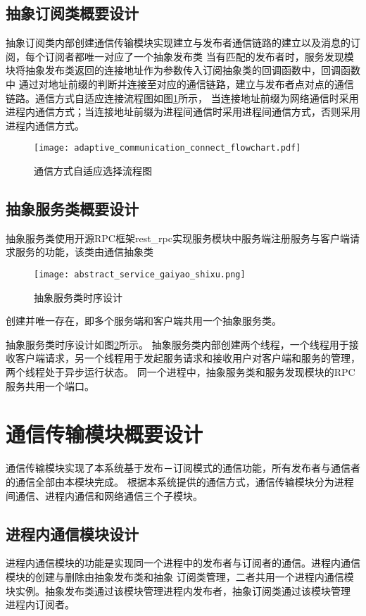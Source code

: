 \subsection{抽象订阅类概要设计}
抽象订阅类内部创建通信传输模块实现建立与发布者通信链路的建立以及消息的订阅，每个订阅者都唯一对应了一个抽象发布类
当有匹配的发布者时，服务发现模块将抽象发布类返回的连接地址作为参数传入订阅抽象类的回调函数中，回调函数中
通过对地址前缀的判断并连接至对应的通信链路，建立与发布者点对点的通信链路。通信方式自适应连接流程图如图\ref{adaptive_communication_connect_flowchart}所示，
当连接地址前缀为网络通信时采用进程内通信方式；当连接地址前缀为进程间通信时采用进程间通信方式，否则采用进程内通信方式。
\begin{figure}[H]
  \centering
  \texttt{[image: adaptive\_communication\_connect\_flowchart.pdf]}
  \caption{通信方式自适应选择流程图}
  \label{adaptive_communication_connect_flowchart}
\end{figure}

\subsection{抽象服务类概要设计}
抽象服务类使用开源RPC框架rest\_rpc实现服务模块中服务端注册服务与客户端请求服务的功能，该类由通信抽象类
\begin{figure}[htb]
  \centering
  \texttt{[image: abstract\_service\_gaiyao\_shixu.png]}
  \caption{抽象服务类时序设计}
  \label{abstract_service_gaiyao_shixu}
\end{figure}
创建并唯一存在，即多个服务端和客户端共用一个抽象服务类。

抽象服务类时序设计如图\ref{abstract_service_gaiyao_shixu}所示。
抽象服务类内部创建两个线程，一个线程用于接收客户端请求，另一个线程用于发起服务请求和接收用户对客户端和服务的管理，两个线程处于异步运行状态。
同一个进程中，抽象服务类和服务发现模块的RPC服务共用一个端口。


\section{通信传输模块概要设计}
通信传输模块实现了本系统基于发布－订阅模式的通信功能，所有发布者与通信者的通信全部由本模块完成。
根据本系统提供的通信方式，通信传输模块分为进程间通信、进程内通信和网络通信三个子模块。

\subsection{进程内通信模块设计}
进程内通信模块的功能是实现同一个进程中的发布者与订阅者的通信。进程内通信模块的创建与删除由抽象发布类和抽象
订阅类管理，二者共用一个进程内通信模块实例。抽象发布类通过该模块管理进程内发布者，抽象订阅类通过该模块管理
进程内订阅者。

